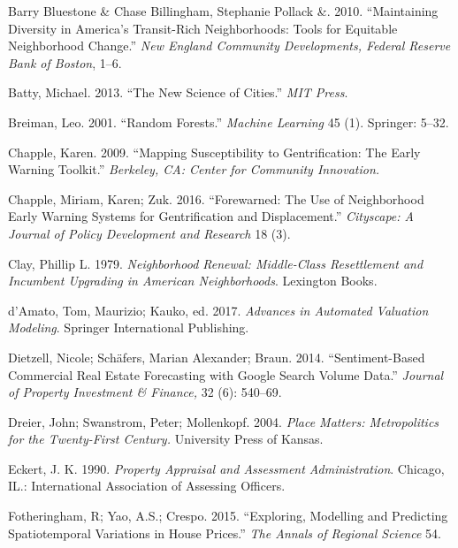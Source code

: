 \documentclass[12pt,]{article}
\begin{document}
\leavevmode\hypertarget{ref-Pollack2010}{}%
Barry Bluestone \& Chase Billingham, Stephanie Pollack \&. 2010.
``Maintaining Diversity in America's Transit-Rich Neighborhoods: Tools
for Equitable Neighborhood Change.'' \emph{New England Community
Developments, Federal Reserve Bank of Boston}, 1--6.

\leavevmode\hypertarget{ref-Batty2013}{}%
Batty, Michael. 2013. ``The New Science of Cities.'' \emph{MIT Press}.

\leavevmode\hypertarget{ref-breiman2001random}{}%
Breiman, Leo. 2001. ``Random Forests.'' \emph{Machine Learning} 45 (1).
Springer: 5--32.

\leavevmode\hypertarget{ref-Chapple2009}{}%
Chapple, Karen. 2009. ``Mapping Susceptibility to Gentrification: The
Early Warning Toolkit.'' \emph{Berkeley, CA: Center for Community
Innovation.}

\leavevmode\hypertarget{ref-Chapple2016}{}%
Chapple, Miriam, Karen; Zuk. 2016. ``Forewarned: The Use of Neighborhood
Early Warning Systems for Gentrification and Displacement.''
\emph{Cityscape: A Journal of Policy Development and Research} 18 (3).

\leavevmode\hypertarget{ref-Clay1979}{}%
Clay, Phillip L. 1979. \emph{Neighborhood Renewal: Middle-Class
Resettlement and Incumbent Upgrading in American Neighborhoods}.
Lexington Books.

\leavevmode\hypertarget{ref-Springer2017}{}%
d'Amato, Tom, Maurizio; Kauko, ed. 2017. \emph{Advances in Automated
Valuation Modeling}. Springer International Publishing.

\leavevmode\hypertarget{ref-Dietzell2014}{}%
Dietzell, Nicole; Schäfers, Marian Alexander; Braun. 2014.
``Sentiment-Based Commercial Real Estate Forecasting with Google Search
Volume Data.'' \emph{Journal of Property Investment \& Finance,} 32 (6):
540--69.

\leavevmode\hypertarget{ref-Dreier2004}{}%
Dreier, John; Swanstrom, Peter; Mollenkopf. 2004. \emph{Place Matters:
Metropolitics for the Twenty-First Century.} University Press of Kansas.

\leavevmode\hypertarget{ref-Eckert1990}{}%
Eckert, J. K. 1990. \emph{Property Appraisal and Assessment
Administration}. Chicago, IL.: International Association of Assessing
Officers.

\leavevmode\hypertarget{ref-Fotheringham2015}{}%
Fotheringham, R; Yao, A.S.; Crespo. 2015. ``Exploring, Modelling and
Predicting Spatiotemporal Variations in House Prices.'' \emph{The Annals
of Regional Science} 54.
\end{document}

